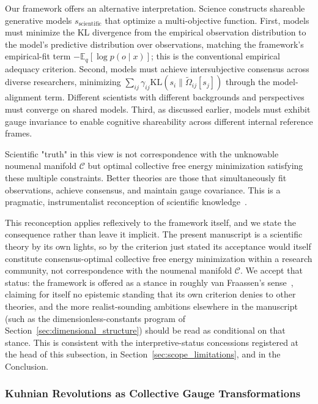 \documentclass[11pt]{article}
\begin{document}
Our framework offers an alternative interpretation. Science constructs shareable generative models $s_{\text{scientific}}$ that optimize a multi-objective function. First, models must minimize the KL divergence from the empirical observation distribution to the model's predictive distribution over observations, matching the framework's empirical-fit term $-\mathbb{E}_q[\log p(o \mid x)]$; this is the conventional empirical adequacy criterion. Second, models must achieve intersubjective consensus across diverse researchers, minimizing $\sum_{ij} \gamma_{ij}\mathrm{KL}(s_i \| \tilde{\Omega}_{ij}[s_j])$ through the model-alignment term. Different scientists with different backgrounds and perspectives must converge on shared models. Third, as discussed earlier, models must exhibit gauge invariance to enable cognitive shareability across different internal reference frames.

Scientific "truth" in this view is not correspondence with the unknowable noumenal manifold $\mathcal{C}$ but optimal collective free energy minimization satisfying these multiple constraints. Better theories are those that simultaneously fit observations, achieve consensus, and maintain gauge covariance. This is a pragmatic, instrumentalist reconception of scientific knowledge~\cite{vanFraassen1980, Laudan1984}.

This reconception applies reflexively to the framework itself, and we state the consequence rather than leave it implicit. The present manuscript is a scientific theory by its own lights, so by the criterion just stated its acceptance would itself constitute consensus-optimal collective free energy minimization within a research community, not correspondence with the noumenal manifold $\mathcal{C}$. We accept that status: the framework is offered as a stance in roughly van Fraassen's sense~\cite{vanFraassen2002}, claiming for itself no epistemic standing that its own criterion denies to other theories, and the more realist-sounding ambitions elsewhere in the manuscript (such as the dimensionless-constants program of Section~\ref{sec:dimensional_structure}) should be read as conditional on that stance. This is consistent with the interpretive-status concessions registered at the head of this subsection, in Section~\ref{sec:scope_limitations}, and in the Conclusion.

\subsubsection{Kuhnian Revolutions as Collective Gauge Transformations}
\end{document}
